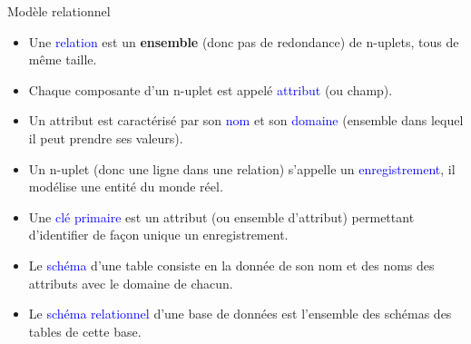 \documentclass[10pt]{beamer}
\begin{document}
\begin{frame}[fragile]{\Ctitle}{\stitle}
	\begin{block}{Modèle relationnel}
		\begin{itemize}
			\item<1-> Une \textcolor{blue}{relation} est un \textbf{ensemble} (donc pas de redondance) de n-uplets, tous de même taille.
			\item<2-> Chaque composante d'un n-uplet est appelé  \textcolor{blue}{attribut} (ou champ).
			\item<3-> Un attribut est caractérisé par son \textcolor{blue}{nom} et son \textcolor{blue}{domaine} (ensemble dans lequel il peut prendre ses valeurs).
			\item<4-> Un n-uplet (donc une ligne dans une relation) s'appelle un \textcolor{blue}{enregistrement}, il modélise une entité du monde réel.
			\item<5-> Une \textcolor{blue}{clé primaire} est un attribut (ou ensemble d'attribut) permettant d'identifier de façon unique un enregistrement.
			\item<6-> Le \textcolor{blue}{schéma} d'une table consiste en la donnée de son nom et des noms des attributs avec le domaine de chacun.
			\item<7-> Le \textcolor{blue}{schéma relationnel} d'une base de données est l'ensemble des schémas des tables de cette base.
		\end{itemize}
	\end{block}
\end{frame}
\end{document}
